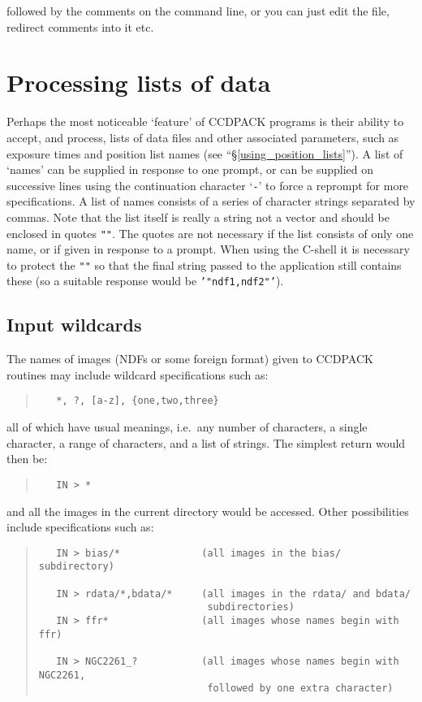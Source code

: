 \documentclass[twoside,11pt]{article}
\newcommand{\hyperref}[4]{#2\ref{#4}#3}
\newcommand{\xlabel}[1]{}
\renewcommand{\_}{\texttt{\symbol{95}}}
\newenvironment{myquote}{\begin{quote}\begin{small}}{\end{small}\end{quote}}
\newcommand{\text}[1]{{\small \tt #1}}
\begin{document}
followed by the comments on the command line, or you can just edit the
file, redirect comments into it etc.

\section{Processing lists of data \label{ndflists} \xlabel{ndflists}}

Perhaps the most noticeable `feature' of CCDPACK programs is their ability to
accept, and process, lists of data files and other associated parameters,
such as exposure times and position list names (see
``\hyperref{using position lists}{\S}{}{using_position_lists}'').
A list of `names' can be supplied in
response to one prompt, or can be supplied on successive lines using the
continuation character `\text{-}' to force a reprompt for more
specifications. A list of names consists of a series of character
strings separated by commas. Note that the list itself is really a
string not a vector and should be enclosed in quotes \text{""}.
The quotes are not necessary if the list consists of only one name, or if
given in response to a prompt. When using the C-shell it is necessary to
protect the \text{""} so that the final string passed to the application
still contains these (so a suitable response would be \text{'"ndf1,ndf2"'}).

\subsection{Input wildcards}
The names of images (NDFs or some foreign format) given to CCDPACK
routines may include wildcard specifications such as:
\begin{myquote}
\begin{verbatim}
   *, ?, [a-z], {one,two,three}
\end{verbatim}
\end{myquote}
all of which have usual meanings, i.e.\ any number of characters, 
a single character, a range of characters, and a list of strings.
The simplest return would then be:
\begin{myquote}
\begin{verbatim}
   IN > *
\end{verbatim}
\end{myquote}
and all the images in the current directory would be accessed. Other
possibilities include specifications such as:
\begin{myquote}
\begin{verbatim}
   IN > bias/*              (all images in the bias/ subdirectory)

   IN > rdata/*,bdata/*     (all images in the rdata/ and bdata/
                             subdirectories)
   IN > ffr*                (all images whose names begin with ffr)

   IN > NGC2261_?           (all images whose names begin with NGC2261,
                             followed by one extra character)
\end{verbatim}
\end{myquote}
\end{document}
